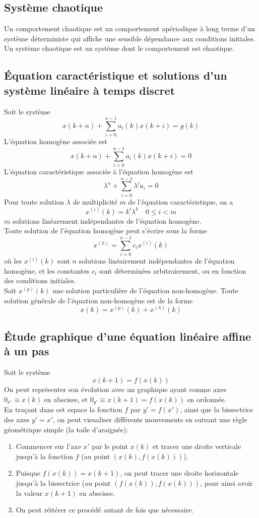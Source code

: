 \documentclass[a4paper]{article}
\begin{document}
\subsection{Système chaotique}
Un comportement chaotique est un comportement apériodique à long terme
d'un système déterministe qui affiche une sensible dépendance aux
conditions initiales.\\
Un système chaotique est un système dont le comportement est chaotique.

\subsection{Équation caractéristique et solutions d'un système linéaire à temps
discret}
Soit le système
\[x(k+n)+\sum_{i=0}^{n-1}a_i(k)x(k+i)=g(k)\]
L'équation homogène associée est
\[x(k+n)+\sum_{i=0}^{n-1}a_i(k)x(k+i)=0\]
L'équation caractéristique associée à l'équation homogène est
\[\lambda^n+\sum_{i=0}^{n-1}\lambda^ia_i=0\]
Pour toute solution \(\lambda\) de multiplicité \(m\) de l'équation
caractéristique, on a
\[x^{(i)}(k)=k^i\lambda^k\quad 0\le i<m\]
\(m\) solutions linéarement indépendantes de l'équation homogène.\\
Toute solution de l'équation homogène peut s'écrire sous la forme
\[x^{(h)}=\sum_{i=0}^{n-1}c_ix^{(i)}(k)\]
où les \(x^{(i)}(k)\) sont \(n\) solutions linéairement indépendantes de
l'équation homogène, et les constantes \(c_i\) sont déterminées
arbitrairement, ou en fonction des conditions initiales. \\
Soit \(x^{(p)}(k)\) une solution particulière de l'équation non-homogène.
Toute solution générale de l'équation non-homogène est de la forme
\[x(k)=x^{(p)}(k)+x^{(h)}(k)\]

\subsection{Étude graphique d'une équation linéaire affine à un pas}
Soit le système
\[x(k+1)=f(x(k))\]
On peut représenter son évolution avec un graphique ayant comme axes
\(0_{x'}\equiv x(k)\) en abscisse, et \(0_{y'}\equiv x(k+1)=f(x(k))\) en ordonnée.\\
En traçant dans cet espace la fonction \(f\) par \(y'=f(x')\), ainsi que la
bissectrice des axes \(y'=x'\), on peut visualiser différents mouvements
en suivant une règle géométrique simple (la toile d'araignée):
\begin{enumerate}
	\item Commencer sur l'axe \(x'\) par le point \(x(k)\) et tracer une droite
		verticale jusqu'à la fonction \(f\) (au point \((x(k),f(x(k)))\)).
	\item Puisque \(f(x(k))=x(k+1)\), on peut tracer une droite horizontale
		jusqu'à la bissectrice (au point \((f(x(k)),f(x(k)))\), pour ainsi
		avoir la valeur \(x(k+1)\) en abscisse.
	\item On peut réitérer ce procédé autant de fois que nécessaire.
\end{enumerate}
\end{document}
